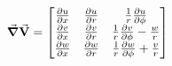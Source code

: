 \begin{equation}
  \grad{\va{V}} = \begin{bmatrix}
  \pdv{u}{x} & 
  \pdv{u}{r} & 
  \frac{1}{r}\pdv{u}{\phi} \\

  \pdv{v}{x} & 
  \pdv{v}{r} & 
  \frac{1}{r}\pdv{v}{\phi} - \frac{w}{r} \\

  \pdv{w}{x} & 
  \pdv{w}{r} & 
  \frac{1}{r}\pdv{w}{\phi} + \frac{v}{r}
  \end{bmatrix}
\end{equation}

